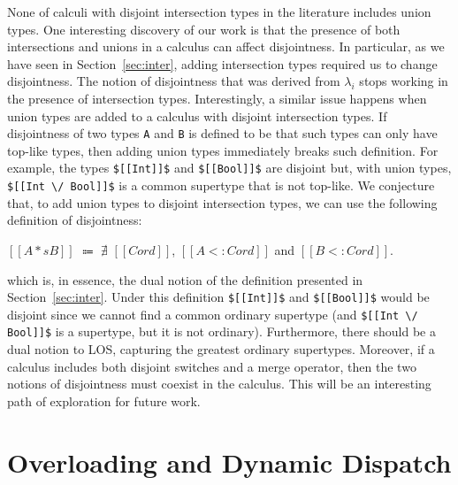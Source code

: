 None of calculi with disjoint intersection types
\citep{oliveira2016disjoint,bi_et_al:LIPIcs:2018:9227,alpuimdisjoint,bi:fiplus} in the literature
includes union types. One interesting discovery of our work is that the
presence of both intersections and unions in a calculus can affect disjointness.
In particular, as we have seen in Section~\ref{sec:inter}, adding intersection types
required us to change disjointness. The notion of disjointness that was
derived from $\lambda_{i}$ stops working in the presence of intersection types.
Interestingly, a similar issue happens when union types are added to
a calculus with disjoint intersection types. If disjointness of two types \lstinline{A}
and \lstinline{B} is defined to be that such types can only have top-like types,
then adding union types immediately breaks such definition.
For example, the types \lstinline{$[[Int]]$} and \lstinline{$[[Bool]]$} are disjoint but, with union
types, \lstinline{$[[Int \/ Bool]]$} is a common supertype that is not top-like.
We conjecture that, to add union types to disjoint intersection types,
we can use the following definition of disjointness:
\vspace{-1mm}
\begin{definition}
\label{def:related:disj}
  $[[A *s B]]$ $\Coloneqq$ $\nexists$ $[[Cord]]$, $[[A <: Cord]]$ and $[[B <: Cord]]$.
\end{definition}
\vspace{-1mm}
\noindent which is, in essence, the dual notion of the definition presented in
Section~\ref{sec:inter}. Under this definition \lstinline{$[[Int]]$} and \lstinline{$[[Bool]]$} would
be disjoint since we cannot find a common ordinary supertype (and \lstinline{$[[Int \/ Bool]]$}
is a supertype, but it is not ordinary). Furthermore, there should be a
dual notion to LOS, capturing the greatest ordinary supertypes. Moreover,
if a calculus includes both disjoint switches and a merge operator,
then the two notions of disjointness must coexist in the calculus.
This will be an interesting path of exploration for future work.


\section{Overloading and Dynamic Dispatch}

